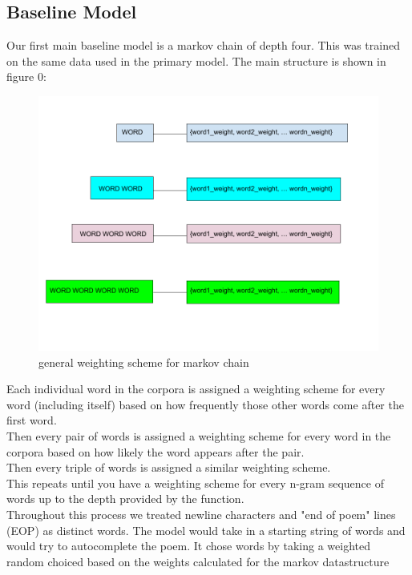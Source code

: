 \documentclass{article} %
\begin{document}
\subsection{Baseline Model}

Our first main baseline model is a markov chain of depth four. This was trained on the same data used in the primary model.
The main structure is shown in figure 0:

\begin{figure}[h]
  \begin{center}
  \includegraphics[width=1\textwidth]{Figs/MARKOV.png}
  \end{center}
  \caption{general weighting scheme for markov chain}
  \label{fig:plot}
  \end{figure}

Each individual word in the corpora is assigned a weighting scheme for every word (including itself) based on how frequently those other words come
after the first word.\\
Then every pair of words is assigned a weighting scheme for every word in the corpora based on how likely the word appears after the pair.\\
Then every triple of words is assigned a similar weighting scheme.\\
This repeats until you have a weighting scheme for every n-gram sequence of words up to the depth provided by the function.\\

Throughout this process we treated newline characters and "end of poem" lines (EOP) as distinct words. The model would take in a starting string of
words and would try to autocomplete the poem. It chose words by taking a weighted random choiced based on the weights calculated for the markov
datastructure\\
\end{document}
